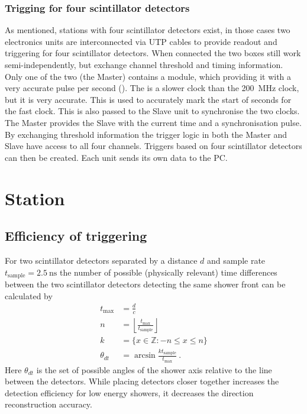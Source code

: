 \subsubsection{Trigging for four scintillator detectors}

As mentioned, stations with four scintillator detectors exist, in those cases two \hisparc electronics units are interconnected via UTP cables to provide readout and triggering for four scintillator detectors. When connected the two boxes still work semi-independently, but exchange channel threshold and timing information. Only one of the two (the Master) contains a \gps module, which providing it with a very accurate pulse per second (\pps). The \pps is a slower clock than the \SI{200}{\mega\hertz} clock, but it is very accurate. This \pps is used to accurately mark the start of seconds for the fast clock. This \pps is also passed to the Slave unit to synchronise the two clocks. The Master provides the Slave with the current time and a synchronisation pulse. By exchanging threshold information the trigger logic in both the Master and Slave have access to all four channels. Triggers based on four scintillator detectors can then be created. Each unit sends its own data to the PC.


\section{Station}

\subsection{Efficiency of triggering}

For two scintillator detectors separated by a distance $d$ and sample rate $t_{\mathrm{sample}} = \SI{2.5}{\ns}$ the number of possible (physically relevant) time differences between the two scintillator detectors detecting the same shower front can be calculated by
%
\begin{equation}
    \begin{split}
        t_{\mathrm{max}} &= \frac{d}{c} \\
        n &= \left\lfloor \frac{t_{\mathrm{max}}}{t_{\mathrm{sample}}} \right\rfloor \\
        k &= \{x \in \mathbb{Z} : -n \leq x \leq n \} \\
        \theta_{dt} &= \arcsin \frac{k t_{\mathrm{sample}}}{t_{\mathrm{max}}} \ .
    \end{split}
\end{equation}
%
Here $\theta_{dt}$ is the set of possible angles of the shower axis relative to the line between the detectors. While placing detectors closer together increases the detection efficiency for low energy showers, it decreases the direction reconstruction accuracy.

